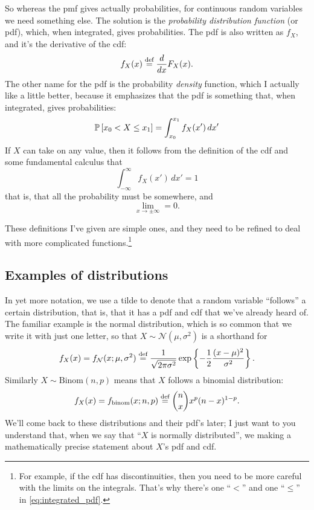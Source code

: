 So whereas the pmf gives actually probabilities, for continuous random
variables we need something else. The solution is the \emph{probability
distribution function} (or pdf), which, when integrated, gives probabilities.
The pdf is also written as $f_X$, and it's the derivative of the cdf:
\begin{equation}
f_X(x) \stackrel{\text{def}}{=} \frac{d}{dx} F_X(x).
\end{equation}
The other name for the pdf is the probability \emph{density} function, which I
actually like a little better, because it emphasizes that the pdf is something
that, when integrated, gives probabilities:
\begin{equation}\label{eq:integrated_pdf}
\mathbb{P}\left[{x_0 < X \leq x_1}\right] = \int_{x_0}^{x_1} f_X(x') \,dx'
\end{equation}
If $X$ can take on any value, then it follows from the definition of the cdf and
some fundamental calculus that
\begin{equation}
\int_{-\infty}^\infty f_X(x') \,dx' = 1
\end{equation}
that is, that all the probability must be somewhere, and
\begin{equation}
\lim_{x \to \pm \infty} = 0.
\end{equation}

These definitions I've given are simple ones, and they need to be refined to
deal with more complicated functions.\footnote{For example, if the cdf has
discontinuities, then you need to be more careful with the limits on the
integrals. That's why there's one ``$<$'' and one ``$\leq$'' in \eqref{eq:integrated_pdf}.}

\subsection{Examples of distributions}

In yet more notation, we use a tilde to denote that a random variable
``follows'' a certain distribution, that is, that it has a pdf and cdf that
we've already heard of. The familiar example is the normal distribution, which
is so common that we write it with just one letter, so that $X \sim
\mathcal{N}(\mu, \sigma^2)$ is a shorthand for
\begin{equation*}
f_X(x) = f_\mathcal{N}(x; \mu, \sigma^2) \stackrel{\text{def}}{=}
  \frac{1}{\sqrt{2\pi\sigma^2}} \exp \left\{-\frac{1}{2} \frac{(x-\mu)^2}{\sigma^2} \right\}.
\end{equation*}
Similarly $X \sim \mathrm{Binom}(n, p)$ means that $X$ follows a binomial distribution:
\begin{equation*}
f_X(x) = f_\mathrm{binom}(x; n, p) \stackrel{\text{def}}{=} \binom{n}{x} x^p (n-x)^{1-p}.
\end{equation*}
We'll come back to these distributions and their pdf's later; I just want to
you understand that, when we say that ``$X$ is normally distributed'', we
making a mathematically precise statement about $X$'s pdf and cdf.


